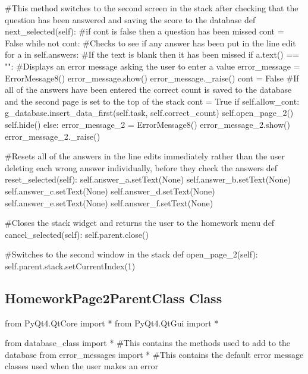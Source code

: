 \begin{landscape}
\begin{python}
    #This method switches to the second screen in the stack after checking that the question has been answered and saving the score to the database
    def next_selected(self):
        #if cont is false then a question has been missed
        cont = False
        while not cont:
            #Checks to see if any answer has been put in the line edit
            for a in self.answers:
                #If the text is blank then it has been missed
                if a.text() == "":
                    #Displays an error message asking the user to enter a value
                    error_message = ErrorMessage8()
                    error_message.show()
                    error_message._raise()
                    cont = False
            #If all of the answers have been entered the correct count is saved to the database and the second page is set to the top of the stack
            cont = True
            if self.allow_cont:
                g_database.insert_data_first(self.task, self.correct_count)
                self.open_page_2()
                self.hide()
            else:
                error_message_2 = ErrorMessage8()
                error_message_2.show()
                error_message_2._raise()

    #Resets all of the answers in the line edits immediately rather than the user deleting each wrong answer individually, before they check the answers
    def reset_selected(self):
        self.answer_a.setText(None)
        self.answer_b.setText(None)
        self.answer_c.setText(None)
        self.answer_d.setText(None)
        self.answer_e.setText(None)
        self.answer_f.setText(None)

    #Closes the stack widget and returns the user to the homework menu
    def cancel_selected(self):
        self.parent.close()

    #Switches to the second window in the stack
    def open_page_2(self):
        self.parent.stack.setCurrentIndex(1)
\end{python}

\subsection{HomeworkPage2ParentClass Class}

\begin{python}
from PyQt4.QtCore import *
from PyQt4.QtGui import *

from database_class import * #This contains the methods used to add to the database
from error_messages import * #This contains the default error message classes used when the user makes an error


\end{python}
\end{landscape}
